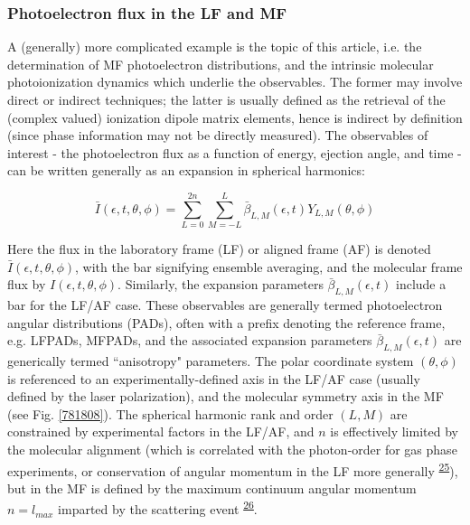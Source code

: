 \documentclass[10pt]{article}
\begin{document}
\subsubsection{Photoelectron flux in the LF and MF}

A (generally) more complicated example is the topic of this article, i.e. the determination of MF photoelectron distributions, and the intrinsic molecular photoionization dynamics which underlie the observables.  The former may involve direct or indirect techniques; the latter is usually defined as the retrieval of the (complex valued) ionization dipole matrix elements, hence is indirect by definition (since phase information may not be directly measured). The observables of interest - the photoelectron flux as a function of energy, ejection angle, and time - can be written generally as an expansion in spherical harmonics:

\begin{equation}
\bar{I}(\epsilon,t,\theta,\phi)=\sum_{L=0}^{2n}\sum_{M=-L}^{L}\bar{\beta}_{L,M}(\epsilon,t)Y_{L,M}(\theta,\phi)\label{eq:AF-PAD-general}
\end{equation}

Here the flux in the laboratory frame (LF) or aligned frame (AF) is denoted $\bar{I}(\epsilon,t,\theta,\phi)$, with the bar signifying ensemble averaging, and the molecular frame flux by $I(\epsilon,t,\theta,\phi)$.  Similarly, the expansion parameters $\bar{\beta}_{L,M}(\epsilon,t)$ include a bar for the LF/AF case. These observables are generally termed photoelectron angular distributions (PADs), often with a prefix denoting the reference frame, e.g. LFPADs, MFPADs, and the associated expansion parameters $\bar{\beta}_{L,M}(\epsilon,t)$ are generically termed ``anisotropy" parameters. The polar coordinate system $(\theta,\phi)$ is referenced to an experimentally-defined axis in the LF/AF case (usually defined by the laser polarization), and the molecular symmetry axis in the MF (see Fig. \ref{781808}). The spherical harmonic rank and order $(L,M)$ are constrained by experimental factors in the LF/AF, and $n$ is effectively limited by the molecular alignment (which is correlated with the photon-order for gas phase experiments, or conservation of angular momentum in the LF more generally \textsuperscript{\hyperref[csl:25]{25}}), but in the MF is defined by the maximum continuum angular momentum $n=l_{max}$ imparted by the scattering event \textsuperscript{\hyperref[csl:26]{26}}. 
\end{document}
